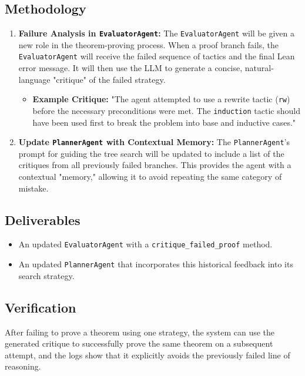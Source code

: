 \documentclass{article}
\begin{document}
\subsection{Methodology}
\begin{enumerate}
    \item \textbf{Failure Analysis in \texttt{EvaluatorAgent}:} The \texttt{EvaluatorAgent} will be given a new role in the theorem-proving process. When a proof branch fails, the \texttt{EvaluatorAgent} will receive the failed sequence of tactics and the final Lean error message. It will then use the LLM to generate a concise, natural-language "critique" of the failed strategy.
        \begin{itemize}
            \item \textbf{Example Critique:} "The agent attempted to use a rewrite tactic (\texttt{rw}) before the necessary preconditions were met. The \texttt{induction} tactic should have been used first to break the problem into base and inductive cases."
        \end{itemize}
    \item \textbf{Update \texttt{PlannerAgent} with Contextual Memory:} The \texttt{PlannerAgent}'s prompt for guiding the tree search will be updated to include a list of the critiques from all previously failed branches. This provides the agent with a contextual "memory," allowing it to avoid repeating the same category of mistake.
\end{enumerate}

\subsection{Deliverables}
\begin{itemize}
    \item An updated \texttt{EvaluatorAgent} with a \texttt{critique\_failed\_proof} method.
    \item An updated \texttt{PlannerAgent} that incorporates this historical feedback into its search strategy.
\end{itemize}

\subsection{Verification}
After failing to prove a theorem using one strategy, the system can use the generated critique to successfully prove the same theorem on a subsequent attempt, and the logs show that it explicitly avoids the previously failed line of reasoning.
\end{document}
